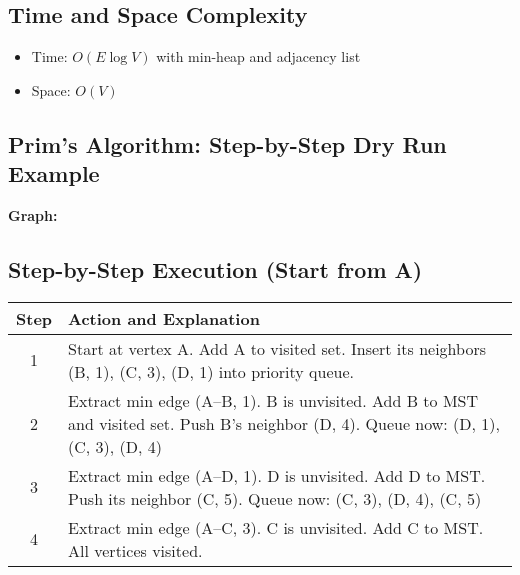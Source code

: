 \documentclass[14pt,a4paper]{extarticle}
\begin{document}
\subsection*{Time and Space Complexity}
\begin{itemize}
    \item Time: $O(E \log V)$ with min-heap and adjacency list
    \item Space: $O(V)$
\end{itemize}

\newpage
\subsection{Prim's Algorithm: Step-by-Step Dry Run Example}

\textbf{Graph:}


\begin{tcolorbox}[title=Directed Weighted Graph]

\end{tcolorbox}


\subsection*{Step-by-Step Execution (Start from A)}

\begin{longtable}{|c|p{8cm}|}
\hline
\textbf{Step} & \textbf{Action and Explanation} \\
\hline
1 & Start at vertex A. Add A to visited set. Insert its neighbors (B, 1), (C, 3), (D, 1) into priority queue. \\
\hline
2 & Extract min edge (A–B, 1). B is unvisited. Add B to MST and visited set. Push B’s neighbor (D, 4). Queue now: (D, 1), (C, 3), (D, 4) \\
\hline
3 & Extract min edge (A–D, 1). D is unvisited. Add D to MST. Push its neighbor (C, 5). Queue now: (C, 3), (D, 4), (C, 5) \\
\hline
4 & Extract min edge (A–C, 3). C is unvisited. Add C to MST. All vertices visited. \\
\hline
\end{longtable}
\end{document}
